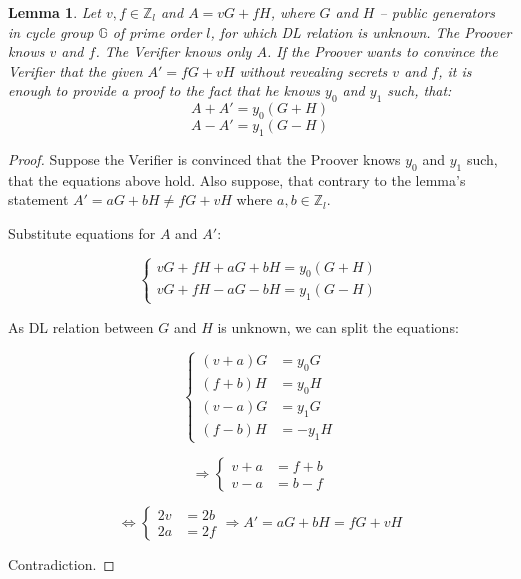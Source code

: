 \documentclass{article}
\numberwithin{figure}{section}
\begin{document}
\newtheorem{theorem}{Theorem}%
\newtheorem{corollary}{Corollary}[theorem]
\newtheorem{lemma}[theorem]{Lemma}


\begin{lemma} \label{l_AA'}
Let $v, f \in \mathbb{Z}_l$ and $A = vG + fH$, where $G$ and $H$ -- public generators in cycle group $\mathbb{G}$ of prime order $l$, for which DL relation is unknown. The Proover knows $v$ and $f$. The Verifier knows only $A$. If the Proover wants to convince the Verifier that the given $A' = fG + vH$ without revealing secrets $v$ and $f$, it is enough to provide a proof to the fact that he knows $y_0$ and $y_1$ such, that:
\[ A + A' = y_0 (G+H) \]
\[ A - A' = y_1 (G-H) \]
\end{lemma}

\begin{proof}
Suppose the Verifier is convinced that the Proover knows $y_0$ and $y_1$ such, that the equations above hold. Also suppose, that contrary to the lemma's statement $A' = aG + bH \neq fG + vH$ where $a, b \in \mathbb{Z}_l$.

Substitute equations for $A$ and $A'$:

\begin{equation*}
    \left\{ \begin{aligned} 
        vG + fH + aG + bH = y_0 (G+H) \\
        vG + fH - aG - bH = y_1 (G-H)
    \end{aligned} \right.
\end{equation*}

As DL relation between $G$ and $H$ is unknown, we can split the equations:

\begin{equation*}
    \left\{ \begin{aligned} 
        (v + a) G &= y_0 G \\
        (f + b) H &= y_0 H \\
        (v - a) G &= y_1 G \\
        (f - b) H &= -y_1 H
    \end{aligned} \right.
\end{equation*}

\begin{equation*}
    \Rightarrow
    \left\{ \begin{aligned} 
        v + a &= f + b \\
        v - a &= b - f
    \end{aligned} \right.
\end{equation*}

\begin{equation*}
    \Leftrightarrow
    \left\{ \begin{aligned} 
        2v &= 2b \\
        2a &= 2f
    \end{aligned} \right.
    \Rightarrow A' = aG + bH = fG + vH 
\end{equation*}

Contradiction.

\end{proof}
\end{document}
